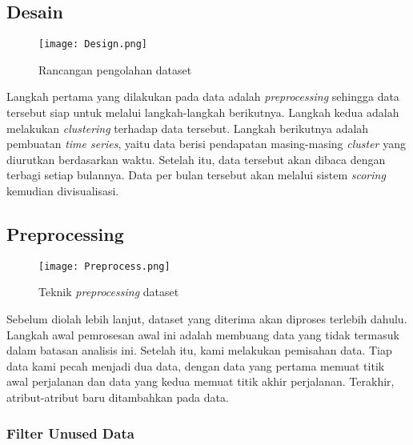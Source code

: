 \documentclass{article}
\begin{document}
\subsection{Desain}

\begin{adjustwidth}{2em}{0pt}

\begin{figure}[H]
	\centering
	\texttt{[image: Design.png]}
	\caption{Rancangan pengolahan dataset}
\end{figure}

\hspace{\parindent}Langkah pertama yang dilakukan pada data adalah \textit{preprocessing} sehingga data tersebut siap untuk melalui langkah-langkah berikutnya. Langkah kedua adalah melakukan \textit{clustering} terhadap data tersebut. Langkah berikutnya adalah pembuatan \textit{time series}, yaitu data berisi pendapatan masing-masing \textit{cluster} yang diurutkan berdasarkan waktu. Setelah itu, data tersebut akan dibaca dengan terbagi setiap bulannya. Data per bulan tersebut akan melalui sistem \textit{scoring} kemudian divisualisasi.

\end{adjustwidth}

\subsection{Preprocessing}

\begin{adjustwidth}{2em}{0pt}

\begin{figure}[H]
	\centering
	\texttt{[image: Preprocess.png]}
	\caption{Teknik \textit{preprocessing} dataset}
\end{figure}

\hspace{\parindent}Sebelum diolah lebih lanjut, dataset yang diterima akan diproses terlebih dahulu. Langkah awal pemrosesan awal ini adalah membuang data yang tidak termasuk dalam batasan analisis ini. Setelah itu, kami melakukan pemisahan data. Tiap data kami pecah menjadi dua data, dengan data yang pertama memuat titik awal perjalanan dan data yang kedua memuat titik akhir perjalanan. Terakhir, atribut-atribut baru ditambahkan pada data.

\end{adjustwidth}

\subsubsection{Filter Unused Data}
\end{document}
